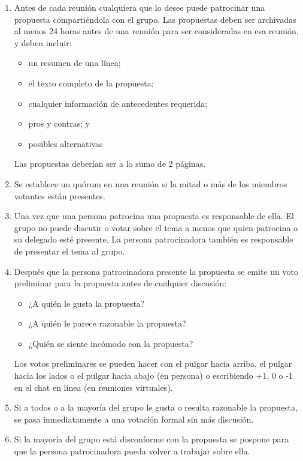 \begin{enumerate}

\item
  Antes de cada reunión
  cualquiera que lo desee puede patrocinar una propuesta compartiéndola con el grupo.
  Las propuestas deben ser archivadas al menos 24 horas antes de una reunión para ser consideradas en esa reunión,
  y deben incluir:
  \begin{itemize}
  \item un resumen de una línea;
  \item el texto completo de la propuesta;
  \item cualquier información de antecedentes requerida;
  \item pros y contras; y
  \item posibles alternativas
  \end{itemize}
  Las propuestas deberían ser a lo sumo de 2 páginas.

\item
  Se establece un quórum en una reunión si la mitad o más de los miembros votantes están presentes.

\item
  Una vez que una persona patrocina una propuesta
  es responsable de ella.
  El grupo no puede discutir o votar sobre el tema a menos que quien patrocina o su delegado esté presente.
  La persona patrocinadora también es responsable de presentar el tema al grupo.

\item
  Después que la persona patrocinadora presente la propuesta
  se emite un voto preliminar para la propuesta antes de cualquier discusión:
  \begin{itemize}
  \item ¿A quién le gusta la propuesta?
  \item ¿A quién le parece razonable la propuesta?
  \item ¿Quién se siente incómodo con la propuesta?
  \end{itemize}
  Los votos preliminares se pueden hacer con el pulgar hacia arriba, el pulgar hacia los lados o el pulgar hacia abajo (en persona)
  o escribiendo +1, 0 o -1 en el chat en línea (en reuniones virtuales).

\item
  Si a todos o a la mayoría del grupo le gusta o resulta razonable la propuesta,
  se pasa inmediatamente a una votación formal sin más discusión.

\item
  Si la mayoría del grupo está disconforme con la propuesta
  se pospone para que la persona patrocinadora pueda volver a trabajar sobre ella.


\end{enumerate}
